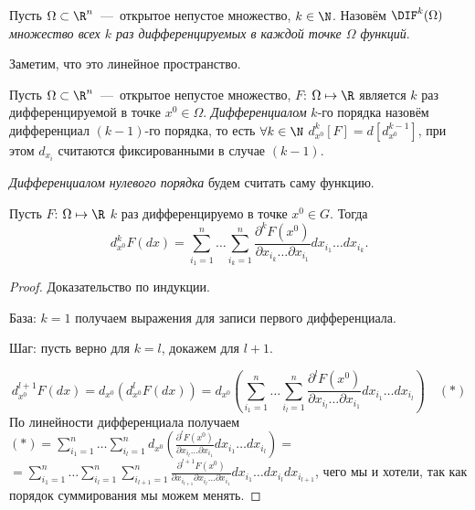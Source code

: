 \begin{definition}
    Пусть $\Omega \subset \R^n$~---~открытое непустое множество, $k \in \N$. Назовём $\DIF^{k} (\Omega)$ \textit{множество всех $k$ раз дифференцируемых в каждой точке $\Omega$ функций}.
\end{definition}

\begin{note}
    Заметим, что это линейное пространство.
\end{note}

\begin{definition}
    Пусть $\Omega \subset \R^n$~---~открытое непустое множество, $F$: $\Omega \mapsto \R$ является $k$ раз дифференцируемой в точке $x^{0} \in \Omega$. \textit{Дифференциалом} $k$-го порядка назовём дифференциал $(k-1)$-го порядка, то есть $\forall k \in \N$ $\displaystyle d_{x^{0}}^{k} [F] = d \left[d_{x^{0}}^{k-1} \right]$, при этом $d_{x_i}$ считаются фиксированными в случае $(k-1)$.

    \textit{Дифференциалом нулевого порядка} будем считать саму функцию.
\end{definition}

\begin{lemma}
    Пусть $F$: $\Omega \mapsto \R$ $k$ раз дифференцируемо в точке $x^{0} \in G$. Тогда
    $$\displaystyle d_{x^0}^{k} F (dx) = \sum\limits_{i_1 = 1}^{n} \ldots \sum\limits_{i_k = 1}^{n} \frac{\partial^{k} F (x^0)}{\partial x_{i_k} \ldots \partial x_{i_1}} dx_{i_1} \ldots dx_{i_k}.$$
\end{lemma}

\begin{proof}
    Доказательство по индукции.

    База: $k = 1$ получаем выражения для записи первого дифференциала.

    Шаг: пусть верно для $k = l$, докажем для $l + 1$.

    $$d_{x^0}^{l + 1} F (dx) = d_{x^{0}} \left( d_{x^{0}}^{l} F (dx)\right) = d_{x^{0}} \left( \sum\limits_{i_1 = 1}^{n} \ldots \sum\limits_{i_l = 1}^{n} \frac{\partial^{l} F (x^0)}{\partial x_{i_l} \ldots \partial x_{i_1}} dx_{i_1} \ldots dx_{i_l}\right) \quad (*)$$
    По линейности дифференциала получаем $(*) = \sum\limits_{i_1 = 1}^{n} \ldots \sum\limits_{i_l = 1}^{n} d_{x^{0}} \left(\frac{\partial^{l} F (x^0)}{\partial x_{i_l} \ldots \partial x_{i_1}} dx_{i_1} \ldots dx_{i_l}\right) = $
    $= \sum\limits_{i_1 = 1}^{n} \ldots \sum\limits_{i_l = 1}^{n} \sum\limits_{i_{l+1} = 1}^{n}\frac{\partial^{l+1} F (x^0)}{\partial x_{i_{l+1}}\partial x_{i_l} \ldots \partial x_{i_1}} dx_{i_1} \ldots dx_{i_l} dx_{i_{l + 1}}$, чего мы и хотели, так как порядок суммирования мы можем менять.
\end{proof}

